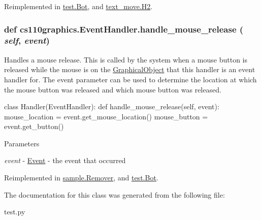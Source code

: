 Reimplemented in \hyperlink{classtest_1_1Bot_a970422a4391cc2b9ff89a2e42063bb6e}{test.Bot}, and \hyperlink{classtext__move_1_1H2_a13611a7fe23eefc92b40ff3874e026bd}{text\_\-move.H2}.\hypertarget{classcs110graphics_1_1EventHandler_a320a7dbf68d37e0101b237bff1713088}{
\subsubsection[{handle\_\-mouse\_\-release}]{\setlength{\rightskip}{0pt plus 5cm}def cs110graphics.EventHandler.handle\_\-mouse\_\-release ( {\em self}, \/   {\em event})}}
\label{classcs110graphics_1_1EventHandler_a320a7dbf68d37e0101b237bff1713088}


Handles a mouse release. This is called by the system when a mouse button is released while the mouse is on the \hyperlink{classcs110graphics_1_1GraphicalObject}{GraphicalObject} that this handler is an event handler for. The event parameter can be used to determine the location at which the mouse button was released and which mouse button was released. 
\begin{DoxyCode}
 class Handler(EventHandler):
     def handle_mouse_release(self, event):
         mouse_location = event.get_mouse_location()
         mouse_button = event.get_button()
\end{DoxyCode}
 
\begin{DoxyParams}{Parameters}
\item[{\em event}]-\/ \hyperlink{classcs110graphics_1_1Event}{Event} -\/ the event that occurred \end{DoxyParams}


Reimplemented in \hyperlink{classsample_1_1Remover_a84484de500f08402e582c126432e0cf1}{sample.Remover}, and \hyperlink{classtest_1_1Bot_a18fc05b6e2c1e42e1b6c639f4844a059}{test.Bot}.

The documentation for this class was generated from the following file:\begin{DoxyCompactItemize}
\item 
test.py\end{DoxyCompactItemize}
